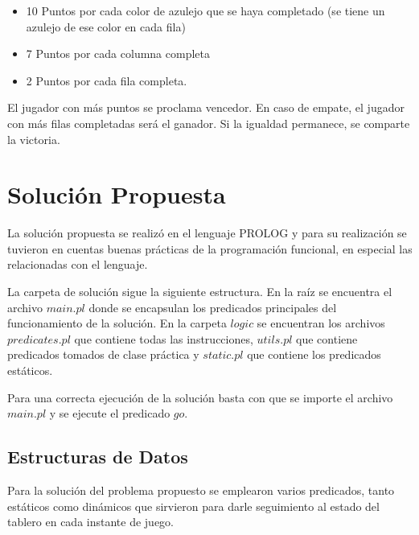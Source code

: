 \documentclass[a4paper,10pt,twocolumn]{article}
\begin{document}
	\begin{itemize}
		\item 10 Puntos por cada color de azulejo que se haya completado (se tiene un azulejo de ese color en cada fila)
		\item 7 Puntos por cada columna completa
		\item 2 Puntos por cada fila completa.
	\end{itemize}

	El jugador con más puntos se proclama vencedor. En caso de empate, el jugador con más filas completadas será el ganador. Si la igualdad permanece, se comparte la victoria.

	
	\section{Solución Propuesta}
	
	La solución propuesta se realizó en el lenguaje PROLOG y para su realización se tuvieron en cuentas buenas prácticas de la programación funcional, en especial las relacionadas con el lenguaje.
	
	La carpeta de solución sigue la siguiente estructura. En la raíz se encuentra el archivo $main.pl$ donde se encapsulan los predicados principales del funcionamiento de la solución. En la carpeta $logic$ se encuentran los archivos $predicates.pl$ que contiene todas las instrucciones, $utils.pl$ que contiene predicados tomados  de clase práctica y $static.pl$ que contiene los predicados estáticos.
	
	Para una correcta ejecución de la solución basta con que se importe el archivo $main.pl$ y se ejecute el predicado $go.$
	
	\subsection{Estructuras de Datos}
	
	Para la solución del problema propuesto se emplearon varios predicados, tanto estáticos como dinámicos que sirvieron para darle seguimiento al estado del tablero en cada instante de juego. 
	
\end{document}
